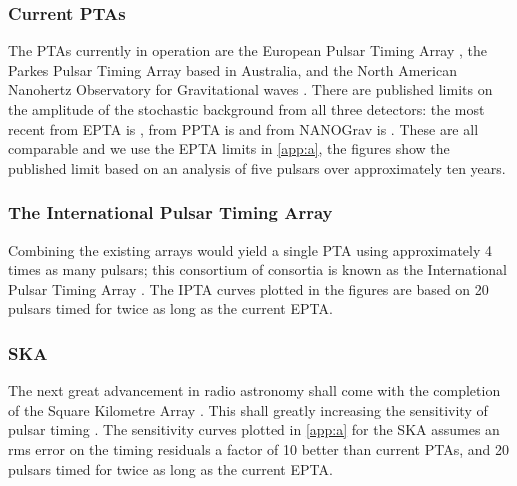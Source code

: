 \subsubsection{Current PTAs}

The PTAs currently in operation are the European Pulsar Timing Array \citep[EPTA;][]{Ferdman2010}, the Parkes Pulsar Timing Array \citep[PPTA;][]{Manchester2013} based in Australia, and the North American Nanohertz Observatory for Gravitational waves \citep[NANOGrav;][]{Jenet2009}. There are published limits on the amplitude of the stochastic background from all three detectors: the most recent from EPTA is \citet{Haasteren}, from PPTA is \citet{Shannon2013} and from NANOGrav is \citet{Arzoumanian2014}. These are all comparable and we use the EPTA limits in \ref{app:a}, the figures show the published limit based on an analysis of five pulsars over approximately ten years.

\subsubsection{The International Pulsar Timing Array}

Combining the existing arrays would yield a single PTA using approximately 4 times as many pulsars; this consortium of consortia is known as the International Pulsar Timing Array \citep[IPTA;][]{Hobbs2010}. The IPTA curves plotted in the figures are based on 20 pulsars timed for twice as long as the current EPTA.

\subsubsection{SKA}

The next great advancement in radio astronomy shall come with the completion of the Square Kilometre Array \citep[SKA;][]{Dewdney2009}. This shall greatly increasing the sensitivity of pulsar timing \citep{Kramer2004}. The sensitivity curves plotted in \ref{app:a} for the SKA assumes an rms error on the timing residuals a factor of 10 better than current PTAs, and 20 pulsars timed for twice as long as the current EPTA.

